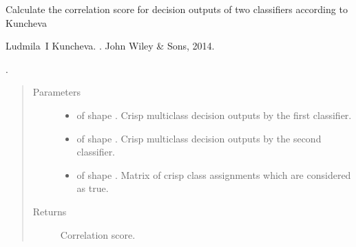 \documentclass[letterpaper,10pt,english]{sphinxmanual}
\begin{document}
\begin{fulllineitems}
\label{\detokenize{pusion.evaluation.evaluation_metrics:pusion.evaluation.evaluation_metrics.correlation}}
\sphinxAtStartPar
Calculate the correlation score for decision outputs of two classifiers according to Kuncheva
%
\begin{footnote}[2]\sphinxAtStartFootnote
Ludmila I Kuncheva. . John Wiley \& Sons, 2014.
%
\end{footnote}.

\sphinxAtStartPar

\begin{quote}\begin{description}
\item[{Parameters}] \leavevmode\begin{itemize}
\item {} 
\sphinxAtStartPar
{} \textendash{}  of shape .
Crisp multiclass decision outputs by the first classifier.

\item {} 
\sphinxAtStartPar
{} \textendash{}  of shape .
Crisp multiclass decision outputs by the second classifier.

\item {} 
\sphinxAtStartPar
{} \textendash{}  of shape .
Matrix of crisp class assignments which are considered as true.

\end{itemize}

\item[{Returns}] \leavevmode
\sphinxAtStartPar
Correlation score.

\end{description}\end{quote}

\end{fulllineitems}

\end{document}
